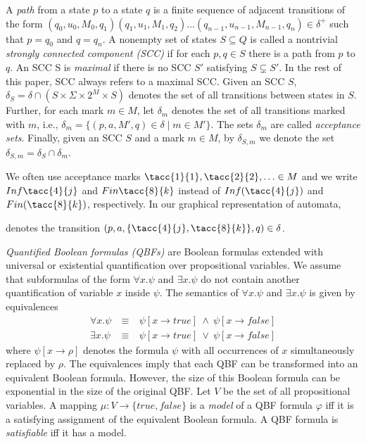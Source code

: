 \documentclass[a4paper,UKenglish,cleveref, autoref, anonymous, thm-restate]{lipics-v2021}
\def\Inf{\ensuremath{\mathsf{Inf}}}
\def\Fin{\ensuremath{\mathsf{Fin}}}
\def\false{\mathit{false}}
\def\true{\mathit{true}}
\begin{document}
A \emph{path} from a state $p$ to a state $q$ is a finite sequence of
adjacent transitions of the form
$(q_0,u_0,M_0,q_1)(q_1,u_1,M_1,q_2)\dots(q_{n-1},u_{n-1},M_{n-1},q_n)\in\delta^+$
such that $p=q_0$ and $q=q_n$. A nonempty set of states $S\subseteq Q$
is called a nontrivial \emph{strongly connected component (SCC)} if
for each $p,q\in S$ there is a path from $p$ to $q$. An SCC S is
\emph{maximal} if there is no SCC $S'$ satisfying $S\subsetneq S'$. In
the rest of this paper, SCC always refers to a maximal SCC. Given an
SCC $S$, $\delta_S=\delta\cap (S\times \Sigma \times 2^M \times S)$
denotes the set of all transitions between states in $S$. Further, for
each mark $m\in M$, let $\delta_m$ denotes the set of all transitions
marked with $m$, i.e., $\delta_m=\{(p,a,M',q)\in\delta\mid m\in
M'\}$. The sets $\delta_m$ are called \emph{acceptance sets}.
Finally, given an SCC $S$ and a mark $m\in M$, by $\delta_{S,m}$ we
denote the set $\delta_{S,m}=\delta_S\cap\delta_m$.

We often use acceptance marks $\tacc{1}{1},\tacc{2}{2},\ldots\in M$
and we write $\Inf\tacc{4}{j}$ and $\Fin\tacc{8}{k}$ instead of
$\Inf(\tacc{4}{j})$ and $\Fin(\tacc{8}{k})$, respectively. In our
graphical representation of automata,
denotes the transition $(p,a,\{\tacc{4}{j},\tacc{8}{k}\},q)\in\delta$.


\bigskip

\emph{Quantified Boolean formulas (QBFs)} are Boolean formulas
extended with universal or existential quantification over
propositional variables. We assume that subformulas of the form
$\forall x.\psi$ and $\exists x.\psi$ do not contain another
quantification of variable $x$ inside $\psi$. The semantics of
$\forall x.\psi$ and $\exists x.\psi$ is given by equivalences
\[
  \begin{array}{rcl}
    \forall x.\psi &~\equiv~& \psi[x\rightarrow\true]~\wedge~\psi[x\rightarrow\false]\\
    \exists x.\psi &~\equiv~& \psi[x\rightarrow\true]~\vee~   \psi[x\rightarrow\false]
  \end{array}
\]
where $\psi[x\rightarrow \rho]$ denotes the formula $\psi$ with all
occurrences of $x$ simultaneously replaced by $\rho$. The equivalences
imply that each QBF can be transformed into an equivalent Boolean
formula. However, the size of this Boolean formula can be exponential
in the size of the original QBF. Let $V$ be the set of all
propositional variables. A mapping $\mu:V\rightarrow\{\true,\false\}$
is a \emph{model} of a QBF formula $\varphi$ iff it is a satisfying
assignment of the equivalent Boolean formula. A QBF formula is
\emph{satisfiable} iff it has a model.
\end{document}
